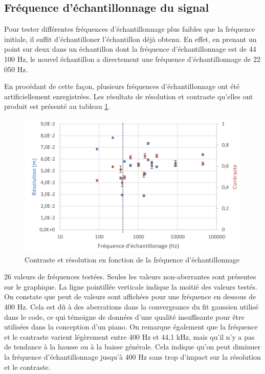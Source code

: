 \documentclass[11pt,letterpaper]{article}
\begin{document}
\subsection{Fréquence d'échantillonnage du signal}

Pour tester différentes fréquences d'échantillonnage plus faibles que la 
fréquence initiale, il suffit d'échantilloner l'échantillon déjà obtenu. En
effet, en prenant un point sur deux dans un échantillon dont la fréquence
d'échantillonnage est de 44 100 Hz, le nouvel échantillon a directement une
fréquence d'échantillonnage de 22 050 Hz. 

En procédant de cette façon, plusieurs fréquences d'échantillonnage ont été
artificiellement enregistrées. Les résultats de résolution et contraste 
qu'elles ont produit est présenté au tableau \ref{fs_fig}.

\begin{figure}[ht]
    \centering
    \includegraphics[scale=0.65]{graphique_fs.png}
    \caption{Contraste et résolution en fonction de la fréquence d'échantillonnage}
    \label{fs_fig}
\end{figure}

26 valeurs de fréquences testées. Seules les valeurs non-aberrantes sont
présentes sur le graphique. La ligne pointillée verticale indique 
la moitié des valeurs testés. On constate que peut de valeurs sont affichées
pour une fréquence en dessous de 400 Hz. Cela est dû à des aberrations dans
la convergeance du fit gaussien utilisé dans le code, ce qui témoigne de 
données d'une qualité insuffisante pour être utilisées dans la conception d'un
piano. 
On remarque également que la fréquence et le contraste varient légèrement entre 
400 Hz et 44,1 kHz, mais qu'il n'y a pas de tendance à la hausse ou à la baisse 
générale. Cela indique qu'on peut diminuer la fréquence d'échantillonnage 
jusqu'à 400 Hz sans trop d'impact sur la résolution et le contraste.
\end{document}

